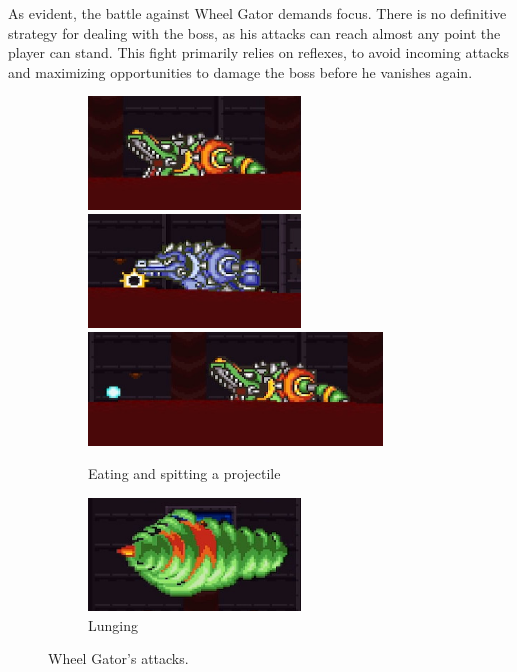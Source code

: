 As evident, the battle against Wheel Gator demands focus. There is no definitive strategy for dealing with the boss, as his attacks can reach almost any point the player can stand. This fight primarily relies on reflexes, to avoid incoming attacks and maximizing opportunities to damage the boss before he vanishes again. \begin{figure}
	\ContinuedFloat
	\centering
	\begin{subfigure}{\linewidth}
		\centering
		\includegraphics[height=3cm]{figures/X2/Wheel_gator/Gator_mouth.png}
		\includegraphics[height=3cm]{figures/X2/Wheel_gator/Gator_absorb.png}
		\vspace{1pt}\\
		\includegraphics[height=3cm]{figures/X2/Wheel_gator/Gator_spit.png}
		\caption{Eating and spitting a projectile}
	\end{subfigure}
	\begin{subfigure}{0.8\linewidth}
		\centering
		\includegraphics[height=3cm]{figures/X2/Wheel_gator/Gator_DM.png}
		\caption{Lunging}
	\end{subfigure}
	\caption{Wheel Gator's attacks.}	
\end{figure}
